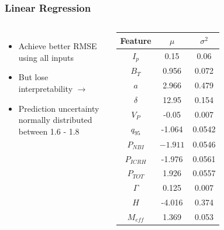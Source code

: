 \documentclass{beamer}
\begin{document}
\begin{frame}
\frametitle{Linear Regression}
\begin{columns}
\begin{itemize}
	\item Achieve better RMSE \\ using all inputs
	\item But lose interpretability $\rightarrow$ 
	\item Prediction uncertainty \\ normally distributed between 1.6 - 1.8
\end{itemize}
\begin{tabular}{ | c | c | c |}
			\hline
			Feature & $\mu$ & $\sigma^2$ \\
			\hline
			$I_p$ & 0.15 & 0.06 \\
			$B_T$ & 0.956 & 0.072 \\
			$a$ & 2.966 & 0.479 \\
			$\delta$ & 12.95 & 0.154 \\
			$V_P$ & -0.05 & 0.007 \\
			$q_{95}$ & -1.064 & 0.0542 \\
			$P_{NBI}$ & $-1.911$ & 0.0546 \\
			$P_{ICRH}$ & -1.976 & 0.0561 \\
			$P_{TOT}$ & 1.926 & 0.0557 \\
			$\Gamma$ & 0.125 & 0.007 \\
			$H$ & -4.016 & 0.374  \\
			$M_{eff}$ & 1.369 & 0.053 \\
			\hline
\end{tabular}
\end{columns}
\end{frame}
\end{document}
